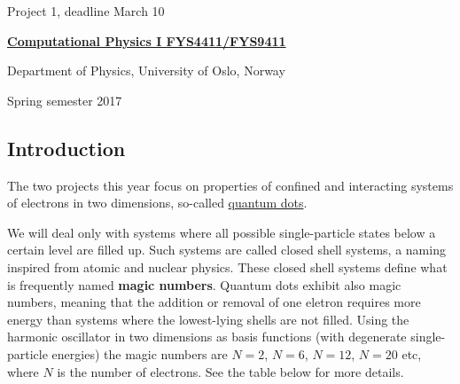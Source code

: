 \documentclass[%
oneside,                 %
final,                   %
10pt]{article}
\begin{document}

\newcommand{\exercisesection}[1]{\subsection*{#1}}






\thispagestyle{empty}

\begin{center}
{\LARGE\bf
\begin{spacing}{1.25}
Project 1, deadline  March 10 
\end{spacing}
}
\end{center}


\begin{center}
{\bf \href{{http://www.uio.no/studier/emner/matnat/fys/FYS4411/index-eng.html}}{Computational Physics I FYS4411/FYS9411}}
\end{center}

    \begin{center}
\centerline{{\small Department of Physics, University of Oslo, Norway}}
\end{center}
    

\begin{center}
Spring semester 2017
\end{center}

\vspace{1cm}


\subsection*{Introduction}

The two projects this year focus on properties of confined and interacting systems of electrons in two dimensions, so-called \href{{http://journals.aps.org/rmp/abstract/10.1103/RevModPhys.74.1283}}{quantum dots}.

We will deal only with systems where all possible single-particle states below a certain level are filled up. Such systems are called closed shell systems, a naming inspired from atomic and nuclear physics. These closed shell systems define what is frequently named \textbf{magic numbers}. Quantum dots exhibit also magic numbers, meaning that the addition or removal of one eletron requires more energy than systems where the lowest-lying shells are not filled. Using the harmonic oscillator in two dimensions as basis functions (with degenerate single-particle energies) the magic numbers are $N=2$, $N=6$, $N=12$, $N=20$ etc, where $N$ is the number of electrons. See the table below for more details. 
\end{document}
